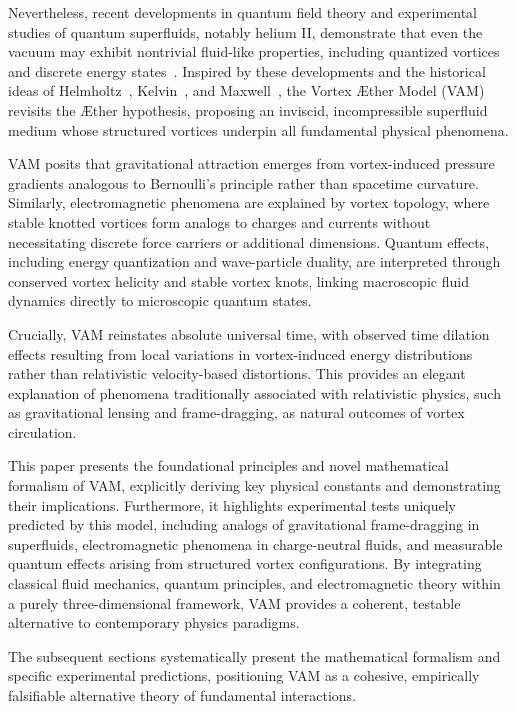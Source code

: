 Nevertheless, recent developments in quantum field theory and experimental studies of quantum superfluids, notably helium II, demonstrate that even the vacuum may exhibit nontrivial fluid-like properties, including quantized vortices and discrete energy states~\cite{Wilczek1999,Donnelly1991quantized}. Inspired by these developments and the historical ideas of Helmholtz~\cite{helmholtz1867integrals}, Kelvin~\cite{kelvin1867vortex}, and Maxwell~\cite{Maxwell1865}, the Vortex Æther Model (VAM) revisits the Æther hypothesis, proposing an inviscid, incompressible superfluid medium whose structured vortices underpin all fundamental physical phenomena.

VAM posits that gravitational attraction emerges from vortex-induced pressure gradients analogous to Bernoulli’s principle rather than spacetime curvature. Similarly, electromagnetic phenomena are explained by vortex topology, where stable knotted vortices form analogs to charges and currents without necessitating discrete force carriers or additional dimensions. Quantum effects, including energy quantization and wave-particle duality, are interpreted through conserved vortex helicity and stable vortex knots, linking macroscopic fluid dynamics directly to microscopic quantum states.

Crucially, VAM reinstates absolute universal time, with observed time dilation effects resulting from local variations in vortex-induced energy distributions rather than relativistic velocity-based distortions. This provides an elegant explanation of phenomena traditionally associated with relativistic physics, such as gravitational lensing and frame-dragging, as natural outcomes of vortex circulation.

This paper presents the foundational principles and novel mathematical formalism of VAM, explicitly deriving key physical constants and demonstrating their implications. Furthermore, it highlights experimental tests uniquely predicted by this model, including analogs of gravitational frame-dragging in superfluids, electromagnetic phenomena in charge-neutral fluids, and measurable quantum effects arising from structured vortex configurations. By integrating classical fluid mechanics, quantum principles, and electromagnetic theory within a purely three-dimensional framework, VAM provides a coherent, testable alternative to contemporary physics paradigms.

The subsequent sections systematically present the mathematical formalism and specific experimental predictions, positioning VAM as a cohesive, empirically falsifiable alternative theory of fundamental interactions.